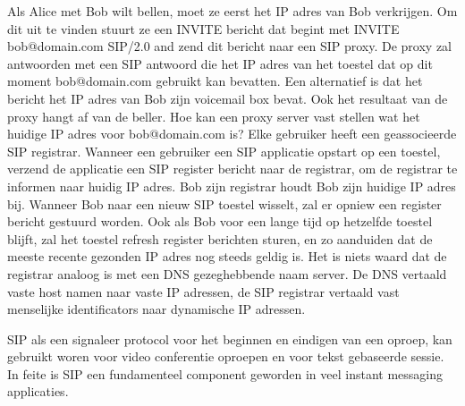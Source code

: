 Als Alice met Bob wilt bellen, moet ze eerst het IP adres van Bob verkrijgen. Om dit uit te vinden stuurt ze een INVITE bericht dat begint met INVITE bob@domain.com SIP/2.0 and zend dit bericht naar een SIP proxy. De proxy zal antwoorden met een SIP antwoord die het IP adres van het toestel dat op dit moment bob@domain.com gebruikt kan bevatten. Een alternatief is  dat het bericht het IP adres van Bob zijn voicemail box bevat. Ook het resultaat van de proxy hangt af van de beller. Hoe kan een proxy server vast stellen wat het huidige IP adres voor bob@domain.com is?
Elke gebruiker heeft een geassocieerde SIP registrar. Wanneer een gebruiker een SIP applicatie opstart op een toestel, verzend de applicatie een SIP register bericht naar de registrar, om de registrar te informen naar huidig IP adres. Bob zijn registrar houdt Bob zijn huidige IP adres bij. Wanneer Bob naar een nieuw SIP toestel wisselt, zal er opniew een register bericht gestuurd worden. Ook als Bob voor een lange tijd op hetzelfde toestel blijft, zal het toestel refresh register berichten sturen, en zo aanduiden dat de meeste recente gezonden IP adres nog steeds geldig is. Het is niets waard dat de registrar analoog is met een DNS gezeghebbende naam server. De DNS vertaald vaste host namen naar vaste IP adressen, de SIP registrar vertaald vast menselijke identificators naar dynamische IP adressen. 

SIP als een signaleer protocol voor het beginnen en eindigen van een oproep, kan gebruikt woren voor video conferentie oproepen en voor tekst gebaseerde sessie. In feite is SIP een fundamenteel component geworden in veel instant messaging applicaties.
